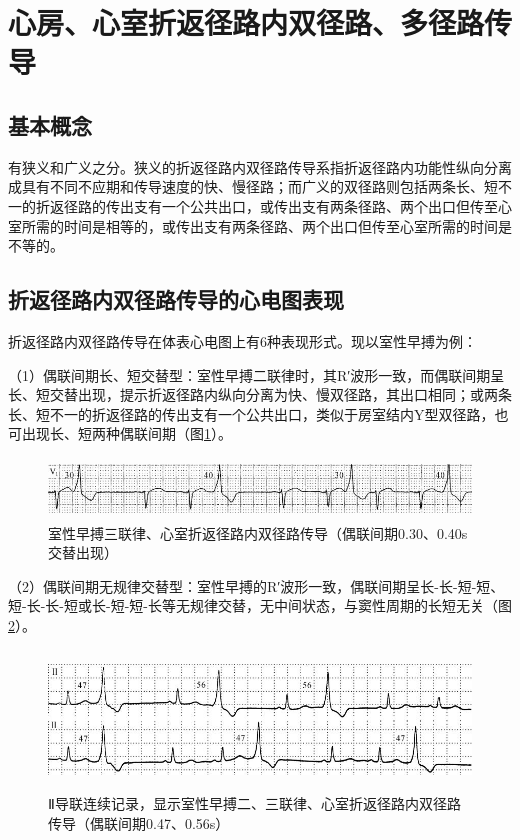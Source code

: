 \section{心房、心室折返径路内双径路、多径路传导}

\protect\hypertarget{text00032.htmlux5cux23subid390}{}{}

\subsection{基本概念}

有狭义和广义之分。狭义的折返径路内双径路传导系指折返径路内功能性纵向分离成具有不同不应期和传导速度的快、慢径路；而广义的双径路则包括两条长、短不一的折返径路的传出支有一个公共出口，或传出支有两条径路、两个出口但传至心室所需的时间是相等的，或传出支有两条径路、两个出口但传至心室所需的时间是不等的。

\protect\hypertarget{text00032.htmlux5cux23subid391}{}{}

\subsection{折返径路内双径路传导的心电图表现}

折返径路内双径路传导在体表心电图上有6种表现形式。现以室性早搏为例：

（1）偶联间期长、短交替型：室性早搏二联律时，其R′波形一致，而偶联间期呈长、短交替出现，提示折返径路内纵向分离为快、慢双径路，其出口相同；或两条长、短不一的折返径路的传出支有一个公共出口，类似于房室结内Y型双径路，也可出现长、短两种偶联间期（图\ref{fig25-20}）。

\begin{figure}[!htbp]
 \centering
 \includegraphics[width=5.58333in,height=0.63542in]{./images/Image00438.jpg}
 \captionsetup{justification=centering}
 \caption{室性早搏三联律、心室折返径路内双径路传导（偶联间期0.30、0.40s交替出现）}
 \label{fig25-20}
  \end{figure} 

（2）偶联间期无规律交替型：室性早搏的R′波形一致，偶联间期呈长-长-短-短、短-长-长-短或长-短-短-长等无规律交替，无中间状态，与窦性周期的长短无关（图\ref{fig25-21}）。

\begin{figure}[!htbp]
 \centering
 \includegraphics[width=5.60417in,height=1.45833in]{./images/Image00439.jpg}
 \captionsetup{justification=centering}
 \caption{Ⅱ导联连续记录，显示室性早搏二、三联律、心室折返径路内双径路传导（偶联间期0.47、0.56s）}
 \label{fig25-21}
  \end{figure} 


